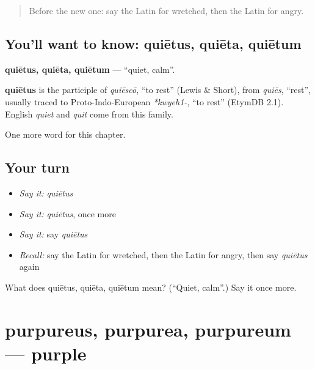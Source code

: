 \label{lesson:LA-C148-quietus}



\begin{quote}
Before the new one: say the Latin for wretched, then the Latin for angry.
\end{quote}

\subsection*{You'll want to know: quiētus, quiēta, quiētum}
\textbf{quiētus, quiēta, quiētum} — \textquotedblleft{}quiet, calm\textquotedblright{}.

\begin{cousinweb}
\textbf{quiētus} is the participle of \emph{quiēscō}, \textquotedblleft{}to rest\textquotedblright{} (Lewis \& Short), from \emph{quiēs}, \textquotedblleft{}rest\textquotedblright{}, usually traced to Proto-Indo-European \emph{*kwyeh1-}, \textquotedblleft{}to rest\textquotedblright{} (EtymDB 2.1). English \emph{quiet} and \emph{quit} come from this family.
\end{cousinweb}

\begin{grammarlens}[title={What you've built}]
One more word for this chapter.
\end{grammarlens}

\subsection*{Your turn}
\begin{itemize}
\raggedright
  \item \emph{Say it:} \emph{quiētus}
  \item \emph{Say it:} \emph{quiētus}, once more
  \item \emph{Say it:} say \emph{quiētus}
  \item \emph{Recall:} say the Latin for wretched, then the Latin for angry, then say \emph{quiētus} again
\end{itemize}

\begin{tcolorbox}[breakable,colback=teal!4,colframe=teal!35!black,title={Before you move on}]
What does quiētus, quiēta, quiētum mean? (\textquotedblleft{}Quiet, calm\textquotedblright{}.) Say it once more.
\end{tcolorbox}
\section[purpureus, purpurea, purpureum]{purpureus, purpurea, purpureum — purple}

